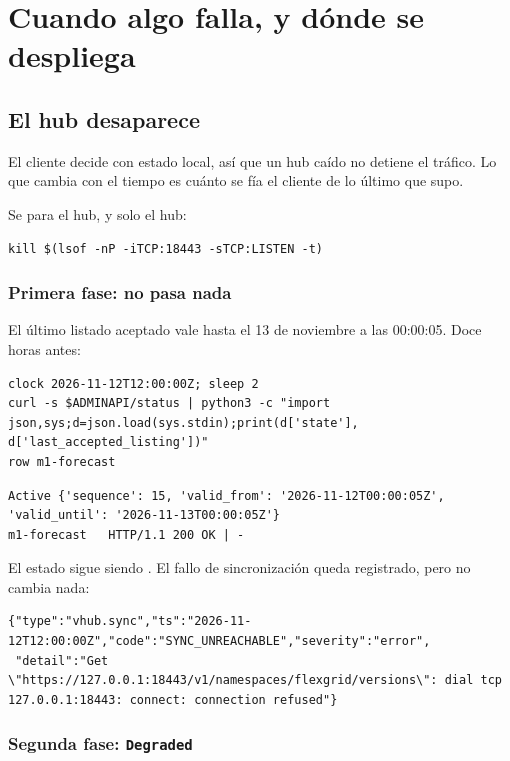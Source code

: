 \chapter{Cuando algo falla, y dónde se despliega}
\label{ch:resiliencia}

\section{El hub desaparece}

El cliente decide con estado local, así que un hub caído no detiene el tráfico. Lo que cambia con el tiempo es
cuánto se fía el cliente de lo último que supo.

Se para el hub, y solo el hub:

\begin{lstlisting}[style=sh]
kill $(lsof -nP -iTCP:18443 -sTCP:LISTEN -t)
\end{lstlisting}

\subsection{Primera fase: no pasa nada}

El último listado aceptado vale hasta el 13 de noviembre a las 00:00:05. Doce horas antes:

\begin{lstlisting}[style=sh]
clock 2026-11-12T12:00:00Z; sleep 2
curl -s $ADMINAPI/status | python3 -c "import json,sys;d=json.load(sys.stdin);print(d['state'], d['last_accepted_listing'])"
row m1-forecast
\end{lstlisting}
\begin{lstlisting}[style=out]
Active {'sequence': 15, 'valid_from': '2026-11-12T00:00:05Z', 'valid_until': '2026-11-13T00:00:05Z'}
m1-forecast   HTTP/1.1 200 OK | -
\end{lstlisting}

El estado sigue siendo . El fallo de sincronización queda registrado, pero no cambia nada:

\begin{lstlisting}[style=json]
{"type":"vhub.sync","ts":"2026-11-12T12:00:00Z","code":"SYNC_UNREACHABLE","severity":"error",
 "detail":"Get \"https://127.0.0.1:18443/v1/namespaces/flexgrid/versions\": dial tcp 127.0.0.1:18443: connect: connection refused"}
\end{lstlisting}

\subsection{Segunda fase: \texttt{Degraded}}

